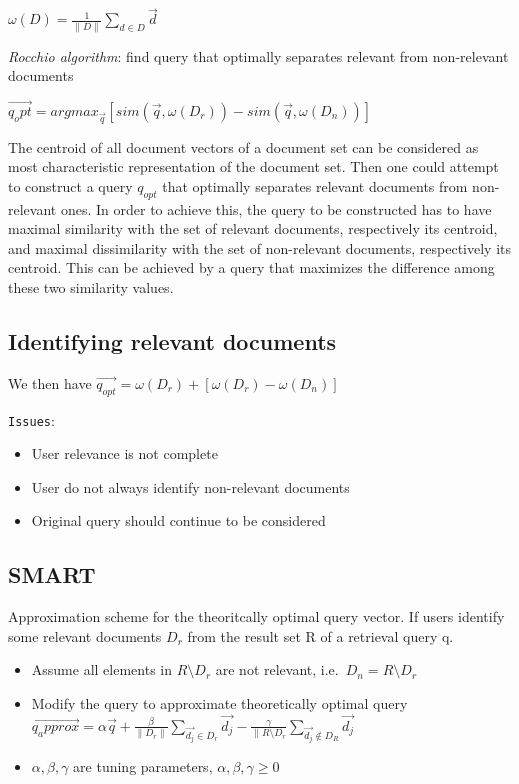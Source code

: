 $ \omega(D) = \frac{1}{\| D \|} \sum_{d \in D} \vec{d} $

\textit{Rocchio algorithm}: find query that optimally separates
relevant from non-relevant documents

$ \vec{q_opt} = argmax_{\vec{q}}[sim(\vec{q}, \omega(D_r)) -
sim(\vec{q}, \omega(D_n))] $

The centroid of all document vectors of a document set can be
considered as most characteristic representation of the document
set. Then one could attempt to construct a query $ q_{opt} $  that
optimally separates relevant documents from non-relevant ones. In
order to achieve this, the query to be constructed has to have maximal
similarity with the set of relevant documents, respectively its
centroid, and maximal dissimilarity with the set of non-relevant
documents, respectively its centroid. This can be achieved by a query
that maximizes the difference among these two similarity values.

\subsection{Identifying relevant documents}

We then have $ \vec{q_{opt}} = \omega(D_r) + [\omega(D_r) -
\omega(D_n)] $

\texttt{Issues}:
\begin{itemize}
\item User relevance is not complete
\item User do not always identify non-relevant documents
\item Original query should continue to be considered
\end{itemize}

\subsection{SMART}

Approximation scheme for the theoritcally optimal query vector.
If users identify some relevant documents $ D_r  $ from the result set
R of a retrieval query q.
\begin{itemize}
\item Assume all elements in $ R \setminus D_r $ are not relevant, i.e.\
  $ D_n = R \setminus D_r $
\item Modify the query to approximate theoretically optimal query
  $ \vec{q_approx} = \alpha \vec{q} + \frac{\beta}{\| D_r \|} \sum_{\vec{d_j} \in D_r} \vec{d_j}
  - \frac{\gamma}{\| R \setminus D_r} \sum_{\vec{d_j} \notin D_R}
  \vec{d_j}$
\item $ \alpha, \beta, \gamma $ are tuning parameters, $ \alpha, \beta,
  \gamma \geq 0 $
\end{itemize}

